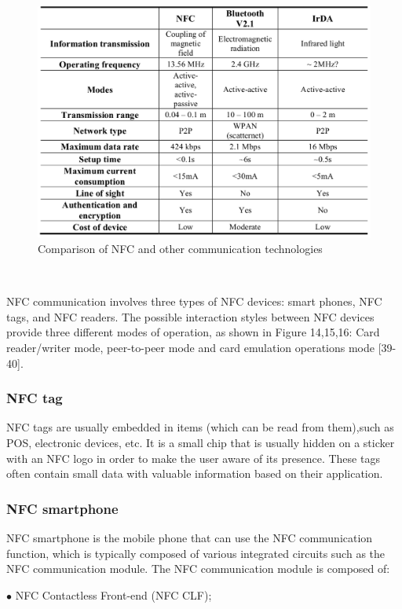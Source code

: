 \documentclass[journal]{IEEEtran}
\begin{document}
\begin{figure}[htbp]
\centerline{\includegraphics[scale=0.25]{ComparisonoNFCandotherPANtechnologies.png}}
\caption{Comparison of NFC and other communication technologies}
\label{fig}
\end{figure}

\
\

NFC communication involves three types of NFC devices: smart phones, NFC tags, and NFC readers. The possible interaction styles between NFC devices provide three different modes of operation, as shown in Figure 14,15,16: Card reader/writer mode, peer-to-peer mode and card emulation operations mode [39-40].


\subsubsection{NFC tag}
NFC tags are usually embedded in items (which can be read from them),such as POS, electronic devices, etc. It is a small chip that is usually hidden on a sticker with an NFC logo in order to make the user aware of its presence. These tags often contain small data with valuable information based on their application.

\subsubsection{NFC smartphone}
NFC smartphone is the mobile phone that can use the NFC communication function, which is typically composed of various integrated circuits such as the NFC communication module. The NFC communication module is composed of:

$\bullet$ NFC Contactless Front-end (NFC CLF);
\end{document}

